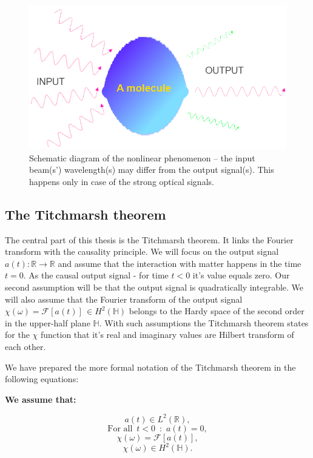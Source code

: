 \documentclass[12pt,twoside,a4paper]{article}
\numberwithin{equation}{subsection}
\numberwithin{figure}{subsection}
\begin{document}
\begin{figure} 
  \includegraphics[width=150mm]{img/opt_phenom3.png}
  \caption{Schematic diagram of the nonlinear phenomenon -- the input beam(s') wavelength(s) may differ from the output signal(s). This happens only in case of the strong optical signals. \label{fig:mathematical_inoutput}}
\end{figure}

\subsection{The Titchmarsh theorem}

The central part of this thesis is the Titchmarsh theorem. It links the Fourier transform with the causality principle. We will focus on the output signal $ a(t) : \mathbb{R} \to \mathbb{R} $ and assume that the interaction with matter happens in the time $ t = 0 $. As the causal output signal - for time $ t < 0 $ it's value equals zero. Our second assumption will be that the output signal is quadratically integrable. We will also assume that the Fourier transform of the output signal $ \chi(\omega) = \mathcal{F}[a(t)] \, \in H^2 (\mathbb{H}) $ belongs to the Hardy space of the second order in the upper-half plane $ \mathbb{H} $. With such assumptions the Titchmarsh theorem states for the $ \chi $ function that it's real and imaginary values are Hilbert transform of each other.

We have prepared the more formal notation of the Titchmarsh theorem in the following equations:

\textbf{We assume that:}
 
\begin{equation} \label{eq:mathematical_l2output}
  a(t) \in L^{2} (\mathbb{R}),
\end{equation}
\begin{equation} \label{eq:mathematical_faoutput}
  \text{For all } \, t < 0 \, \text{ : } \, a (t) = 0,
\end{equation}
\begin{equation} \label{eq:mathematical_ttisfourier}
  \chi(\omega) = \mathcal{F}[a(t)],
\end{equation}
\begin{equation} \label{eq:mathematical_tth2fourier}
  \chi(\omega) \in H^2(\mathbb{H}).
\end{equation}
\end{document}
